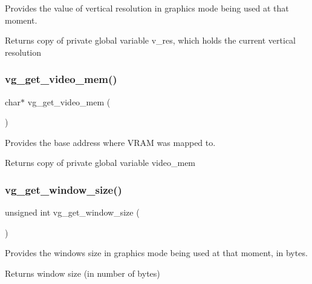 Provides the value of vertical resolution in graphics mode being used at that moment. 

\begin{DoxyReturn}{Returns}
copy of private global variable v\+\_\+res, which holds the current vertical resolution 
\end{DoxyReturn}
\hypertarget{group__video__gr_ga0cd2b85b0088ab47b2b7bb6c135ad4b1}{}\label{group__video__gr_ga0cd2b85b0088ab47b2b7bb6c135ad4b1} 
\subsubsection{\texorpdfstring{vg\+\_\+get\+\_\+video\+\_\+mem()}{vg\_get\_video\_mem()}}
{\footnotesize\ttfamily char$\ast$ vg\+\_\+get\+\_\+video\+\_\+mem (\begin{DoxyParamCaption}{ }\end{DoxyParamCaption})}



Provides the base address where V\+R\+AM was mapped to. 

\begin{DoxyReturn}{Returns}
copy of private global variable video\+\_\+mem 
\end{DoxyReturn}
\hypertarget{group__video__gr_ga4151e15542f022beebb852786a5c19ef}{}\label{group__video__gr_ga4151e15542f022beebb852786a5c19ef} 
\subsubsection{\texorpdfstring{vg\+\_\+get\+\_\+window\+\_\+size()}{vg\_get\_window\_size()}}
{\footnotesize\ttfamily unsigned int vg\+\_\+get\+\_\+window\+\_\+size (\begin{DoxyParamCaption}{ }\end{DoxyParamCaption})}



Provides the window\textquotesingle{}s size in graphics mode being used at that moment, in bytes. 

\begin{DoxyReturn}{Returns}
window size (in number of bytes) 
\end{DoxyReturn}
\hypertarget{group__video__gr_gacef21667c79365d57a084bed994c2189}{}\label{group__video__gr_gacef21667c79365d57a084bed994c2189} 
